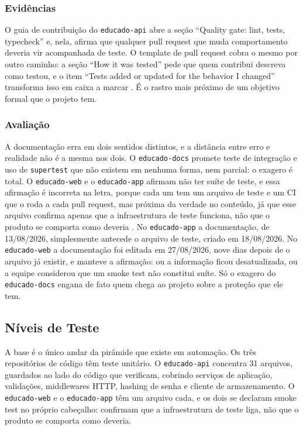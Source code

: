 \subsubsection*{Evidências}

O guia de contribuição do \texttt{educado-api} abre a seção ``Quality gate:
lint, tests, typecheck'' e, nela, afirma que qualquer pull
request que muda comportamento deveria vir acompanhada de teste. O
template de pull request cobra o mesmo por outro caminho: a seção ``How it was
tested'' pede que quem contribui descreva como testou, e o item
``Tests added or updated for the behavior I changed'' transforma isso
em caixa a marcar \cite{educado-repos}. É o rastro mais próximo de um objetivo
formal que o projeto tem.

\subsubsection*{Avaliação}

A documentação erra em dois sentidos distintos, e a distância entre erro e
realidade não é a mesma nos dois. O \texttt{educado-docs} promete teste de
integração e uso de \texttt{supertest} que não existem em nenhuma forma, nem
parcial: o exagero é total. O \texttt{educado-web} e o \texttt{educado-app}
afirmam não ter suíte de teste, e essa afirmação é incorreta na letra, porque
cada um tem um arquivo de teste e um CI que o roda a cada pull request, mas
próxima da verdade no conteúdo, já que esse arquivo confirma apenas que a
infraestrutura de teste funciona, não que o produto se comporta como deveria
\cite{educado-repos}. No \texttt{educado-app} a documentação, de 13/08/2026,
simplesmente antecede o arquivo de teste, criado em 18/08/2026. No
\texttt{educado-web} a documentação foi editada em 27/08/2026, nove dias depois
de o arquivo já existir, e manteve a afirmação: ou a informação ficou
desatualizada, ou a equipe considerou que um smoke test não constitui suíte. Só
o exagero do \texttt{educado-docs} engana de fato quem chega ao projeto sobre a
proteção que ele tem.


\subsection{Níveis de Teste}

A base é o único andar da pirâmide que existe em automação. Os três
repositórios de código têm teste unitário. O \texttt{educado-api}
\cite{educado-repos} concentra 31 arquivos, guardados ao lado do código que
verificam, cobrindo serviços de aplicação,
validações, middlewares HTTP, hashing de senha e cliente de armazenamento. O
\texttt{educado-web} \cite{educado-repos} e o \texttt{educado-app}
\cite{educado-repos} têm um arquivo cada, e os dois se declaram smoke test no
próprio cabeçalho: confirmam que a infraestrutura de teste liga, não que o
produto se comporta como deveria.

